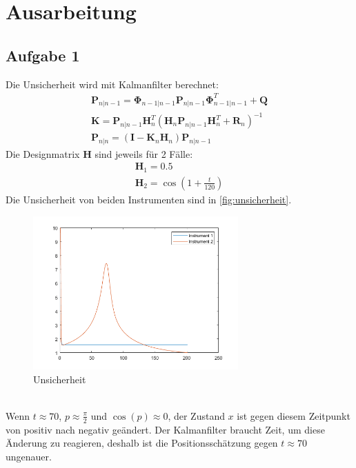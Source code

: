 \chapter{Ausarbeitung}
\section{Aufgabe 1}
Die Unsicherheit wird mit Kalmanfilter berechnet:
\begin{gather}
	\bm{P}_{n|n-1} = \bm{\Phi}_{n-1|n-1} \bm{P}_{n|n-1} \bm{\Phi}^T_{n-1|n-1} + \bm{Q} \\
	\bm{K} = \bm{P}_{n|n-1} \bm{H}_n^T \left(\bm{H}_n \bm{P}_{n|n-1} \bm{H}_n^T + \bm{R}_n \right)^{-1} \\
	\bm{P}_{n|n} = \left(\bm{I} - \bm{K}_n \bm{H}_n\right) \bm{P}_{n|n-1}
\end{gather}
Die Designmatrix $\bm{H}$ sind jeweils für 2 Fälle:
\begin{gather}
	\bm{H}_1 = 0.5 \\
	\bm{H}_2 = \cos(1 + \frac{t}{120})
\end{gather}
Die Unsicherheit von beiden Instrumenten sind in \autoref{fig:unsicherheit}.
\begin{figure}[htbp]
	\centering
	\includegraphics[width=0.7\textwidth]{images/aufgabe1} 
	\caption{Unsicherheit} 
	\label{fig:unsicherheit}
\end{figure}\\
Wenn $t \approx 70$, $p \approx \frac{\pi}{2}$ und $\cos(p) \approx 0$, der Zustand $x$ ist gegen diesem Zeitpunkt von positiv nach negativ geändert. Der Kalmanfilter braucht Zeit, um diese Änderung zu reagieren, deshalb ist die Positionsschätzung gegen $t \approx 70$ ungenauer. 
